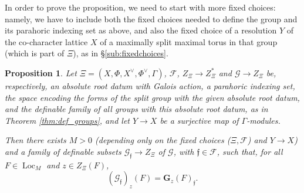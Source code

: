 \documentclass{amsart}
\newcommand{\cF}{\mathcal{F}}
\newcommand{\cG}{\mathcal{G}}
\DeclareMathOperator{\loc}{Loc}
\newcommand{\bG}{\mathbf{G}}
\newcommand{\ff}{{\mathfrak f}}
\theoremstyle{plain}
\newtheorem{prop}[thm]{Proposition}
\theoremstyle{definition}
\begin{document}
In order to prove the proposition, we need to start with  more fixed choices: namely, we have to include both the fixed choices needed to define the group and its parahoric indexing set as above, and also the fixed choice of a resolution $Y$ of the co-character lattice $X$ of a maximally split maximal torus in that group (which is part of $\Xi$), as in 
\S \ref{sub:fixedchoices}. 

 
\begin{prop}\label{prop:main}
 Let $\Xi=(X,\Phi, X^\vee, \Phi^\vee, \Gamma)$,  $\cF$, $Z_\Xi\to Z_\Xi^\ast$ and $\cG\to Z_\Xi$ be, respectively, an absolute root datum with Galois action, a parahoric indexing set, the space encoding the forms of the split group with the given absolute root datum, and the definable family of all groups with this absolute root datum, as in Theorem \ref{thm:def_groups}, and let $Y\to X$ be a surjective map of $\Gamma$-modules. 

Then there exists $M>0$ (depending only on the fixed choices ($\Xi, \cF$) and $Y\to X$) and a family of definable 
subsets $\cG_{\ff} \to Z_\Xi$ of $\cG$, with $\ff\in \cF$,
 such that, for all $F\in \loc_M$ and $z\in Z_\Xi(F)$, 
\[
(\cG_{\ff})_{z}(F)= \bG_z(F)_{\ff}.
\]
\end{prop}
\end{document}
